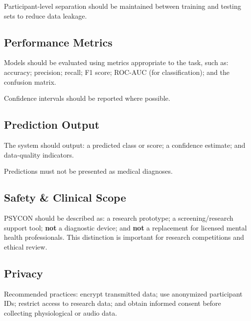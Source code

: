 \begin{engnote}
Participant-level separation should be maintained between training and testing sets to reduce data leakage.
\end{engnote}

\subsection{Performance Metrics}
\label{sec:performance-metrics}

Models should be evaluated using metrics appropriate to the task, such as: accuracy; precision; recall; F1 score; ROC-AUC (for classification); and the confusion matrix.

\begin{requirementbox}
Confidence intervals should be reported where possible.
\end{requirementbox}

\subsection{Prediction Output}
\label{sec:prediction-output}

The system should output: a predicted class or score; a confidence estimate; and data-quality indicators.

\begin{warningbox}
Predictions must not be presented as medical diagnoses.
\end{warningbox}

\subsection{Safety \& Clinical Scope}
\label{sec:safety-clinical-scope}

\begin{warningbox}
PSYCON should be described as: a research prototype; a screening/research support tool; \textbf{not} a diagnostic device; and \textbf{not} a replacement for licensed mental health professionals. This distinction is important for research competitions and ethical review.
\end{warningbox}

\subsection{Privacy}
\label{sec:privacy-ch7}

Recommended practices: encrypt transmitted data; use anonymized participant IDs; restrict access to research data; and obtain informed consent before collecting physiological or audio data.

